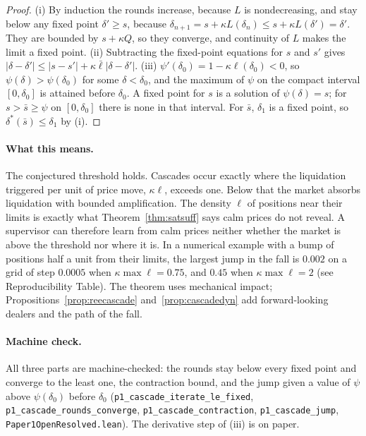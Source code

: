 \begin{proof}
(i) By induction the rounds increase, because $L$ is nondecreasing, and stay below any fixed point $\delta'\ge s$, because $\delta_{n+1}=s+\kappa L(\delta_n)\le s+\kappa L(\delta')=\delta'$. They are bounded by $s+\kappa Q$, so they converge, and continuity of $L$ makes the limit a fixed point. (ii) Subtracting the fixed-point equations for $s$ and $s'$ gives $|\delta-\delta'|\le|s-s'|+\kappa\bar\ell|\delta-\delta'|$. (iii) $\psi'(\delta_0)=1-\kappa\ell(\delta_0)<0$, so $\psi(\delta)>\psi(\delta_0)$ for some $\delta<\delta_0$, and the maximum of $\psi$ on the compact interval $[0,\delta_0]$ is attained before $\delta_0$. A fixed point for $s$ is a solution of $\psi(\delta)=s$; for $s>\bar s\ge\psi$ on $[0,\delta_0]$ there is none in that interval. For $\bar s$, $\delta_1$ is a fixed point, so $\delta^*(\bar s)\le\delta_1$ by (i).
\end{proof}

\paragraph{What this means.} The conjectured threshold holds. Cascades occur exactly where the liquidation triggered per unit of price move, $\kappa\ell$, exceeds one. Below that the market absorbs liquidation with bounded amplification. The density $\ell$ of positions near their limits is exactly what Theorem~\ref{thm:satsuff} says calm prices do not reveal. A supervisor can therefore learn from calm prices neither whether the market is above the threshold nor where it is. In a numerical example with a bump of positions half a unit from their limits, the largest jump in the fall is $0.002$ on a grid of step $0.0005$ when $\kappa\max\ell=0.75$, and $0.45$ when $\kappa\max\ell=2$ (see Reproducibility Table). The theorem uses mechanical impact; Propositions~\ref{prop:reecascade} and~\ref{prop:cascadedyn} add forward-looking dealers and the path of the fall.

\paragraph{Machine check.} All three parts are machine-checked: the rounds stay below every fixed point and converge to the least one, the contraction bound, and the jump given a value of $\psi$ above $\psi(\delta_0)$ before $\delta_0$ (\texttt{p1\_cascade\_iterate\_le\_fixed}, \texttt{p1\_cascade\_rounds\_converge}, \texttt{p1\_cascade\_contraction}, \texttt{p1\_cascade\_jump}, \nolinkurl{Paper1OpenResolved.lean}). The derivative step of (iii) is on paper.

